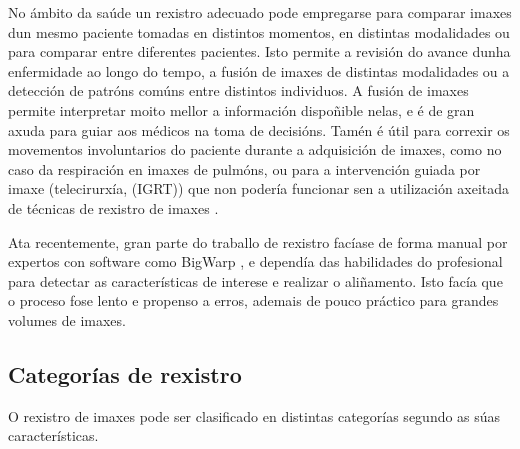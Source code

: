 No ámbito da saúde un rexistro adecuado pode empregarse para comparar imaxes dun mesmo paciente tomadas en distintos momentos, en distintas modalidades ou para comparar entre diferentes pacientes.
Isto permite a revisión do avance dunha enfermidade ao longo do tempo, a fusión de imaxes de distintas modalidades ou a detección de patróns comúns entre distintos individuos.
A fusión de imaxes permite interpretar moito mellor a información dispoñible nelas, e é de gran axuda para guiar aos médicos na toma de decisións.
Tamén é útil para correxir os movementos involuntarios do paciente durante a adquisición de imaxes, como no caso da respiración en imaxes de pulmóns, ou para a intervención guiada por imaxe (telecirurxía, (\gls{IGRT})) que non 
podería funcionar sen a utilización axeitada de técnicas de rexistro de imaxes \cite{wang2022neuralrenderingstereo3d}. 

Ata recentemente, gran parte do traballo de rexistro facíase de forma manual por expertos con software como BigWarp \cite{bigwarp}, 
e dependía das habilidades do profesional para detectar as características de interese e realizar o aliñamento.
Isto facía que o proceso fose lento e propenso a erros, ademais de pouco práctico para grandes volumes de imaxes.

\subsection{Categorías de rexistro}
\label{subsec:Categorías de rexistro}

O rexistro de imaxes pode ser clasificado en distintas categorías segundo as súas características.

